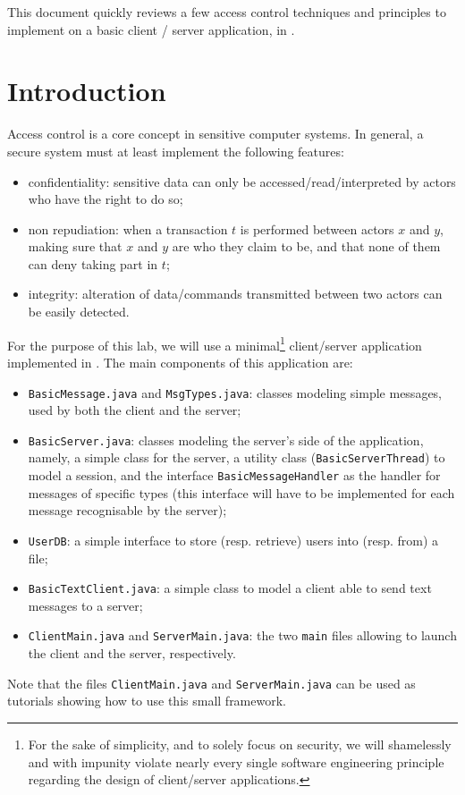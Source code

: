 \documentclass[a4paper,11pt]{article}
\author{R. Absil \and P. Hauweele}
\begin{document}
\pagestyle{fancy} %

\maketitle

This document quickly reviews a few access control techniques and principles to implement on a basic client / server application, in \java.

\section*{Introduction}

Access control is a core concept in sensitive computer systems. In general, a secure system must at least implement the following features:
\begin{itemize}
\item confidentiality: sensitive data can only be accessed/read/interpreted by actors who have the right to do so;
\item non repudiation: when a transaction $t$ is performed between actors $x$ and $y$, making sure that $x$ and $y$ are who they claim to be, and that none of them can deny taking part in $t$;
\item integrity: alteration of data/commands transmitted between two actors can be easily detected.\\
\end{itemize}

For the purpose of this lab, we will use a minimal\footnote{For the sake of simplicity, and to solely focus on security, we will shamelessly and with impunity violate nearly every single software engineering principle regarding the design of client/server applications.} client/server application implemented in \java. The main components of this application are:
\begin{itemize}
\item \texttt{BasicMessage.java} and \texttt{MsgTypes.java}: classes modeling simple messages, used by both the client and the server;
\item \texttt{BasicServer.java}: classes modeling the server's side of the application, namely, a simple class for the server, a utility class (\texttt{BasicServerThread}) to model a session, and the interface \texttt{BasicMessageHandler} as the handler for messages of specific types (this interface will have to be implemented for each message recognisable by the server);
\item \texttt{UserDB}: a simple interface to store (resp. retrieve) users into (resp. from) a file;
\item \texttt{BasicTextClient.java}: a simple class to model a client able to send text messages to a server;
\item \texttt{ClientMain.java} and \texttt{ServerMain.java}: the two \texttt{main} files allowing to launch the client and the server, respectively.
\end{itemize}
Note that the files \texttt{ClientMain.java} and \texttt{ServerMain.java} can be used as tutorials showing how to use this small framework.
\end{document}
